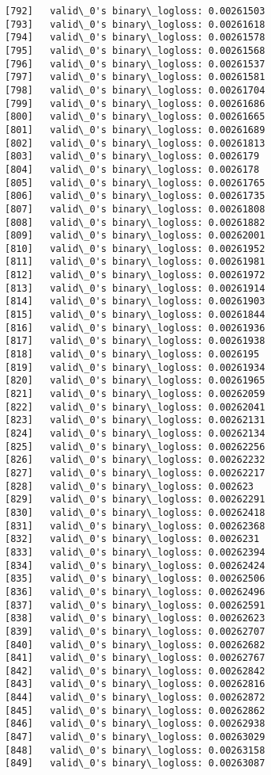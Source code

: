 \documentclass[11pt]{article}
\begin{document}
\begin{Verbatim}[commandchars=\\\{\}]
[792]	valid\_0's binary\_logloss: 0.00261503
[793]	valid\_0's binary\_logloss: 0.00261618
[794]	valid\_0's binary\_logloss: 0.00261578
[795]	valid\_0's binary\_logloss: 0.00261568
[796]	valid\_0's binary\_logloss: 0.00261537
[797]	valid\_0's binary\_logloss: 0.00261581
[798]	valid\_0's binary\_logloss: 0.00261704
[799]	valid\_0's binary\_logloss: 0.00261686
[800]	valid\_0's binary\_logloss: 0.00261665
[801]	valid\_0's binary\_logloss: 0.00261689
[802]	valid\_0's binary\_logloss: 0.00261813
[803]	valid\_0's binary\_logloss: 0.0026179
[804]	valid\_0's binary\_logloss: 0.0026178
[805]	valid\_0's binary\_logloss: 0.00261765
[806]	valid\_0's binary\_logloss: 0.00261735
[807]	valid\_0's binary\_logloss: 0.00261808
[808]	valid\_0's binary\_logloss: 0.00261882
[809]	valid\_0's binary\_logloss: 0.00262001
[810]	valid\_0's binary\_logloss: 0.00261952
[811]	valid\_0's binary\_logloss: 0.00261981
[812]	valid\_0's binary\_logloss: 0.00261972
[813]	valid\_0's binary\_logloss: 0.00261914
[814]	valid\_0's binary\_logloss: 0.00261903
[815]	valid\_0's binary\_logloss: 0.00261844
[816]	valid\_0's binary\_logloss: 0.00261936
[817]	valid\_0's binary\_logloss: 0.00261938
[818]	valid\_0's binary\_logloss: 0.0026195
[819]	valid\_0's binary\_logloss: 0.00261934
[820]	valid\_0's binary\_logloss: 0.00261965
[821]	valid\_0's binary\_logloss: 0.00262059
[822]	valid\_0's binary\_logloss: 0.00262041
[823]	valid\_0's binary\_logloss: 0.00262131
[824]	valid\_0's binary\_logloss: 0.00262134
[825]	valid\_0's binary\_logloss: 0.00262256
[826]	valid\_0's binary\_logloss: 0.00262232
[827]	valid\_0's binary\_logloss: 0.00262217
[828]	valid\_0's binary\_logloss: 0.002623
[829]	valid\_0's binary\_logloss: 0.00262291
[830]	valid\_0's binary\_logloss: 0.00262418
[831]	valid\_0's binary\_logloss: 0.00262368
[832]	valid\_0's binary\_logloss: 0.0026231
[833]	valid\_0's binary\_logloss: 0.00262394
[834]	valid\_0's binary\_logloss: 0.00262424
[835]	valid\_0's binary\_logloss: 0.00262506
[836]	valid\_0's binary\_logloss: 0.00262496
[837]	valid\_0's binary\_logloss: 0.00262591
[838]	valid\_0's binary\_logloss: 0.00262623
[839]	valid\_0's binary\_logloss: 0.00262707
[840]	valid\_0's binary\_logloss: 0.00262682
[841]	valid\_0's binary\_logloss: 0.00262767
[842]	valid\_0's binary\_logloss: 0.00262842
[843]	valid\_0's binary\_logloss: 0.00262816
[844]	valid\_0's binary\_logloss: 0.00262872
[845]	valid\_0's binary\_logloss: 0.00262862
[846]	valid\_0's binary\_logloss: 0.00262938
[847]	valid\_0's binary\_logloss: 0.00263029
[848]	valid\_0's binary\_logloss: 0.00263158
[849]	valid\_0's binary\_logloss: 0.00263087

\end{Verbatim}
\end{document}
